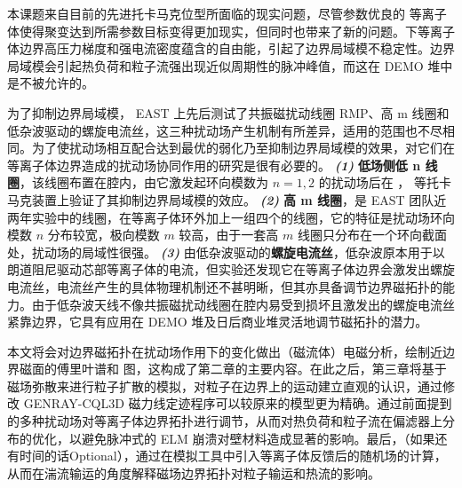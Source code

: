 \begin{cabstract}
  本课题来自目前的先进托卡马克位型所面临的现实问题，尽管参数优良的 \Hmode 等离子体使得聚变达到所需参数目标变得更加现实，但同时也带来了新的问题。\Hmode 下等离子体边界高压力梯度和强电流密度蕴含的自由能，引起了边界局域模不稳定性。边界局域模会引起热负荷和粒子流强出现近似周期性的脉冲峰值，而这在 DEMO 堆中是不被允许的。

  为了抑制边界局域模， EAST 上先后测试了共振磁扰动线圈 RMP、高 m 线圈和低杂波驱动的螺旋电流丝，这三种扰动场产生机制有所差异，适用的范围也不尽相同。为了使扰动场相互配合达到最优的弱化乃至抑制边界局域模的效果，对它们在等离子体边界造成的扰动场协同作用的研究是很有必要的。 \textit{\textbf{(1)}} \textbf{低场侧低 n 线圈}，该线圈布置在腔内，由它激发起环向模数为 $n=1,2$ 的扰动场后在 \east， \ddd 等托卡马克装置上验证了其抑制边界局域模的效应。 \textit{\textbf{(2)}} \textbf{高 m 线圈}，是 EAST 团队近两年实验中的线圈，在等离子体环外加上一组四个的线圈，它的特征是扰动场环向模数 $n$ 分布较宽，极向模数 $m$ 较高，由于一套高 $m$ 线圈只分布在一个环向截面处，扰动场的局域性很强。 \textit{\textbf{(3)}} 由低杂波驱动的\textbf{螺旋电流丝}，低杂波原本用于以朗道阻尼驱动芯部等离子体的电流，但实验还发现它在等离子体边界会激发出螺旋电流丝，电流丝产生的具体物理机制还不甚明晰，但其亦具备调节边界磁拓扑的能力。由于低杂波天线不像共振磁扰动线圈在腔内易受到损坏且激发出的螺旋电流丝紧靠边界，它具有应用在 DEMO 堆及日后商业堆灵活地调节磁拓扑的潜力。

  本文将会对边界磁拓扑在扰动场作用下的变化做出（磁流体）电磁分析，绘制近边界磁面的傅里叶谱和 \Poincare 图，这构成了第二章的主要内容。在此之后，第三章将基于磁场弥散来进行粒子扩散的模拟，对粒子在边界上的运动建立直观的认识，通过修改 GENRAY-CQL3D 磁力线定迹程序可以较原来的模型更为精确。通过前面提到的多种扰动场对等离子体边界拓扑进行调节，从而对热负荷和粒子流在偏滤器上分布的优化，以避免脉冲式的 ELM 崩溃对壁材料造成显著的影响。最后，（如果还有时间的话Optional），通过在模拟工具中引入等离子体反馈后的随机场的计算，从而在湍流输运的角度解释磁场边界拓扑对粒子输运和热流的影响。
  

\end{cabstract}


